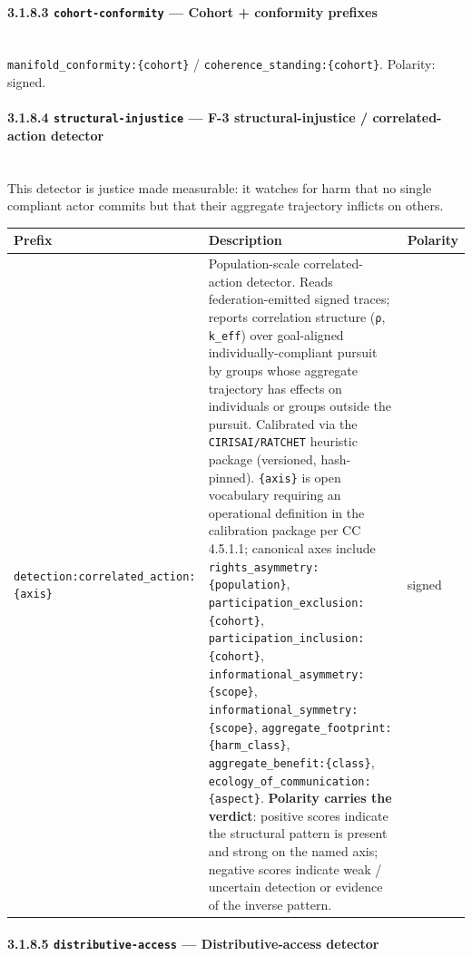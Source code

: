 \documentclass[11pt]{article}
\begin{document}
\paragraph{3.1.8.3 \texttt{cohort-conformity} — Cohort + conformity prefixes}\mbox{}\\


\texttt{manifold\_conformity:\{cohort\}} / \texttt{coherence\_standing:\{cohort\}}. Polarity: signed.


\paragraph{3.1.8.4 \texttt{structural-injustice} — F-3 structural-injustice / correlated-action detector}\mbox{}\\


This detector is justice made measurable: it watches for harm that no single compliant actor commits but that their aggregate trajectory inflicts on others.


{\footnotesize
\begin{longtable}{|p{5.33cm}|p{5.33cm}|p{5.33cm}|}\hline
\textbf{Prefix} & \textbf{Description} & \textbf{Polarity} \\ \hline\endhead
\texttt{detection:correlated\_action:\{axis\}} & Population-scale correlated-action detector. Reads federation-emitted signed traces; reports correlation structure (\texttt{ρ}, \texttt{k\_eff}) over goal-aligned individually-compliant pursuit by groups whose aggregate trajectory has effects on individuals or groups outside the pursuit. Calibrated via the \texttt{CIRISAI/RATCHET} heuristic package (versioned, hash-pinned). \texttt{\{axis\}} is open vocabulary requiring an operational definition in the calibration package per CC 4.5.1.1; canonical axes include \texttt{rights\_asymmetry:\{population\}}, \texttt{participation\_exclusion:\{cohort\}}, \texttt{participation\_inclusion:\{cohort\}}, \texttt{informational\_asymmetry:\{scope\}}, \texttt{informational\_symmetry:\{scope\}}, \texttt{aggregate\_footprint:\{harm\_class\}}, \texttt{aggregate\_benefit:\{class\}}, \texttt{ecology\_of\_communication:\{aspect\}}. \textbf{Polarity carries the verdict}: positive scores indicate the structural pattern is present and strong on the named axis; negative scores indicate weak / uncertain detection or evidence of the inverse pattern. & signed \\ \hline
\end{longtable}}


\paragraph{3.1.8.5 \texttt{distributive-access} — Distributive-access detector}\mbox{}\\
\end{document}
